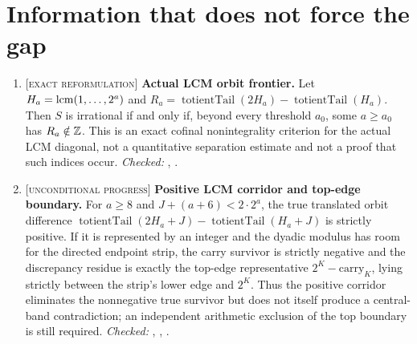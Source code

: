 \documentclass[11pt]{article}
\newcommand{\Stot}{S}
\newcommand{\stag}[1]{{\normalfont\footnotesize\textsc{[#1]}}}
\begin{document}
\section{Information that does not force the gap}\label{sec:nogo}
\begin{enumerate}
\item\label{res:actualorbit} \stag{exact reformulation}
\textbf{Actual LCM orbit frontier.}  Let
$H_a=\operatorname{lcm}(1,\ldots,2^a)$ and
$R_a=\operatorname{totientTail}(2H_a)-\operatorname{totientTail}(H_a)$.
Then $\Stot$ is irrational if and only if, beyond every threshold $a_0$,
some $a\ge a_0$ has $R_a\notin\mathbb{Z}$.  This is an exact cofinal
nonintegrality criterion for the actual LCM diagonal, not a quantitative
separation estimate and not a proof that such indices occur.
{\footnotesize\emph{Checked:}
,
.}

\item\label{res:actualsign} \stag{unconditional progress}
\textbf{Positive LCM corridor and top-edge boundary.}  For $a\ge8$ and
$J+(a+6)<2\cdot2^a$, the true translated orbit difference
$\operatorname{totientTail}(2H_a+J)-\operatorname{totientTail}(H_a+J)$ is
strictly positive.  If it is represented by an integer and the dyadic
modulus has room for the directed endpoint strip, the carry survivor is
strictly negative and the discrepancy residue is exactly the top-edge
representative $2^K-\mathrm{carry}_K$, lying strictly between the strip's lower
edge and $2^K$.  Thus the positive corridor eliminates the nonnegative true
survivor but does not itself produce a central-band contradiction; an
independent arithmetic exclusion of the top boundary is still required.
{\footnotesize\emph{Checked:}
,
,
.}


\end{enumerate}
\end{document}
